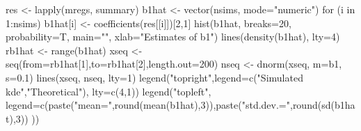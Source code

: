 \begin{Schunk}
\begin{Sinput}
 res <- lapply(mregs, summary)
 b1hat <- vector(nsims, mode="numeric")
 for (i in 1:nsims){ b1hat[i] <- coefficients(res[[i]])[2,1]}
 hist(b1hat, breaks=20, probability=T, main="", xlab="Estimates of b1")
 lines(density(b1hat), lty=4)
 rb1hat <- range(b1hat)
 xseq <- seq(from=rb1hat[1],to=rb1hat[2],length.out=200)
 nseq <- dnorm(xseq, m=b1, s=0.1)
 lines(xseq, nseq, lty=1)
 legend("topright",legend=c("Simulated kde","Theoretical"), lty=c(4,1))
 legend("topleft", legend=c(paste("mean=",round(mean(b1hat),3)),paste("std.dev.=",round(sd(b1hat),3)) ))
\end{Sinput}
\end{Schunk}
